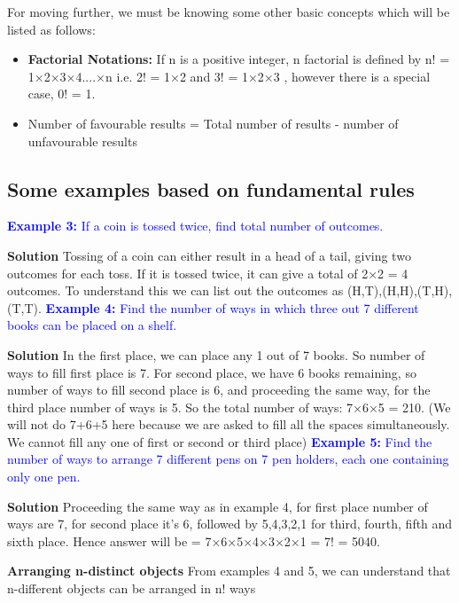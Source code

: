 \documentclass[12pt, a4paper]{article}
\begin{document}
For moving further, we must be knowing some other basic concepts which will be listed as follows:
\begin{itemize}
    \item \textbf{Factorial Notations:} If n is a positive integer, n factorial is defined by n! = 1×2×3×4....×n i.e. 2! = 1×2 and 3! = 1×2×3 , however there is a special case, 0! = 1.
    \item Number of favourable results = Total number of results - number of unfavourable results
\end{itemize}

\newpage
\subsection{Some examples based on fundamental rules}
\textcolor{blue}{\textbf{Example 3:} If a coin is tossed twice, find total number of outcomes.}

\textbf{Solution} Tossing of a coin can either result in a head of a tail, giving two outcomes for each toss. If it is tossed twice, it can give a total of 2×2 = 4 outcomes. To understand this we can list out the outcomes as {(H,T),(H,H),(T,H),(T,T)}.\newline
\textcolor{blue}{\textbf{Example 4:} Find the number of ways in which three out 7 different books can be placed on a shelf.}

\textbf{Solution} In the first place, we can place any 1 out of 7 books. So number of ways to fill first place is 7. For second place, we have 6 books remaining, so number of ways to fill second place is 6, and proceeding the same way, for the third place number of ways is 5. So the total number of ways: 7×6×5 = 210. (We will not do 7+6+5 here because we are asked to fill all the spaces simultaneously. We cannot fill any one of first or second or third place)\newline
\textcolor{blue}{\textbf{Example 5:} Find the number of ways to arrange 7 different pens on 7 pen holders, each one containing only one pen.}

\textbf{Solution} Proceeding the same way as in example 4, for first place number of ways are 7, for second place it's 6, followed by 5,4,3,2,1 for third, fourth, fifth and sixth place. Hence answer will be = 7×6×5×4×3×2×1 = 7! = 5040. 
\begin{tcolorbox}[colback=TealBlue!10!White,colframe=TealBlue!50!black]
\textbf{Arranging n-distinct objects}
From examples 4 and 5, we can understand that n-different objects can be arranged in n! ways
\end{tcolorbox}
\end{document}
